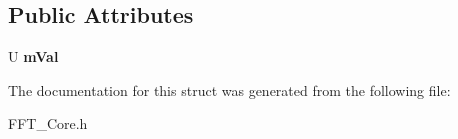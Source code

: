\subsection*{Public Attributes}
\begin{DoxyCompactItemize}
\item 
\mbox{\label{struct_s_i_m_d_vector_a0264a9602d3178b2c6d8165697841cce}} 
U {\bfseries m\+Val}
\end{DoxyCompactItemize}


The documentation for this struct was generated from the following file\+:\begin{DoxyCompactItemize}
\item 
F\+F\+T\+\_\+\+Core.\+h\end{DoxyCompactItemize}
